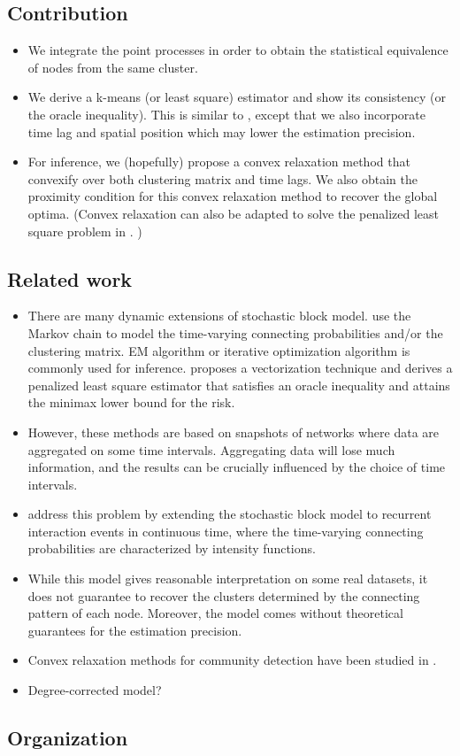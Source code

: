 \subsection*{Contribution}
\begin{itemize}
	\item We integrate the point processes in order to obtain the statistical equivalence of nodes from the same cluster.
	\item We derive a k-means (or least square) estimator and show its consistency (or the oracle inequality). This is similar to \citet{Pensky2019a}, except that we also incorporate time lag and spatial position which may lower the estimation precision.
	\item For inference, we (hopefully) propose a convex relaxation method that convexify over both clustering matrix and time lags. We also obtain the proximity condition for this convex relaxation method to recover the global optima. (Convex relaxation can also be adapted to solve the penalized least square problem in \citet{Pensky2019a}. )
\end{itemize}




\subsection*{Related work}
\begin{itemize}
	\item There are many dynamic extensions of stochastic block model. 
	\citet{Yang2011,Xu2014a,Matias2016,Xu2015} use the Markov chain to model the time-varying  connecting probabilities and/or the clustering matrix. 
	EM algorithm or iterative optimization algorithm is commonly used for inference.
	\citet{Pensky2019a} proposes a vectorization technique and derives a penalized least square estimator that satisfies an oracle inequality and  attains the minimax lower bound for the risk.
	\item However, these methods are based on snapshots of networks where data are aggregated on some time intervals. 
	Aggregating data will lose much information, and the results can be crucially influenced by the choice of time intervals. 
	\item \citet{Matias2018} address this problem by extending the stochastic block model to recurrent interaction events in continuous time, where the time-varying connecting probabilities are characterized by intensity functions.
	\item While this model gives reasonable interpretation on some real datasets, it does not guarantee to recover the clusters determined by the connecting pattern of each node. Moreover, the model comes without theoretical guarantees for the estimation precision. 
	\item Convex relaxation methods for community detection have been studied in \citet{Li2018,Li2017,Peng2005}.
	\item {\color{blue} Degree-corrected model?}

\end{itemize}





\subsection*{Organization}



